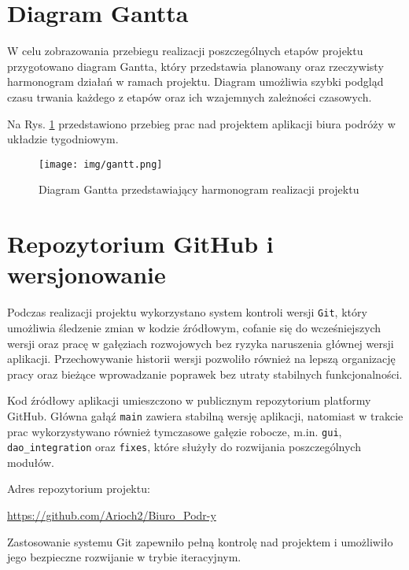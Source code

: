 
\section{Diagram Gantta}

W celu zobrazowania przebiegu realizacji poszczególnych etapów projektu przygotowano diagram Gantta, który przedstawia planowany oraz rzeczywisty harmonogram działań w ramach projektu. Diagram umożliwia szybki podgląd czasu trwania każdego z etapów oraz ich wzajemnych zależności czasowych.

Na Rys. \ref{fig:gantt_diagram} przedstawiono przebieg prac nad projektem aplikacji biura podróży w układzie tygodniowym.

\begin{figure}[H]
    \centering
    \texttt{[image: img/gantt.png]}
    \caption{Diagram Gantta przedstawiający harmonogram realizacji projektu}
    \label{fig:gantt_diagram}
\end{figure}


\section{Repozytorium GitHub i wersjonowanie}

Podczas realizacji projektu wykorzystano system kontroli wersji \texttt{Git}, który umożliwia śledzenie zmian w kodzie źródłowym, cofanie się do wcześniejszych wersji oraz pracę w gałęziach rozwojowych bez ryzyka naruszenia głównej wersji aplikacji. Przechowywanie historii wersji pozwoliło również na lepszą organizację pracy oraz bieżące wprowadzanie poprawek bez utraty stabilnych funkcjonalności.

Kod źródłowy aplikacji umieszczono w publicznym repozytorium platformy GitHub. Główna gałąź \texttt{main} zawiera stabilną wersję aplikacji, natomiast w trakcie prac wykorzystywano również tymczasowe gałęzie robocze, m.in. \texttt{gui}, \texttt{dao\_integration} oraz \texttt{fixes}, które służyły do rozwijania poszczególnych modułów.

Adres repozytorium projektu:
\begin{center}
\url{https://github.com/Arioch2/Biuro_Podr-y}
\end{center}

Zastosowanie systemu Git zapewniło pełną kontrolę nad projektem i umożliwiło jego bezpieczne rozwijanie w trybie iteracyjnym.
